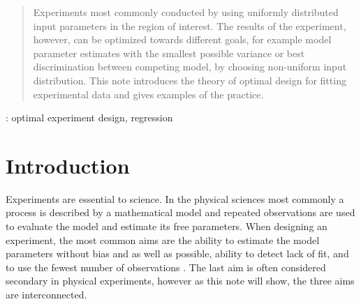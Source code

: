\documentclass[12pt]{iopart}
\begin{document}
\author{G Imreh and W-Y Cheng}
\address{Institute of Atomic and Molecular Sciences, Academia Sinica, Taiwan}
\begin{abstract}
Experiments most commonly conducted by using uniformly distributed input parameters in the region of interest. The results of the experiment, however, can be optimized towards different goals, for example model parameter estimates with the smallest possible variance or best discrimination between competing model, by choosing non-uniform input distribution. This note introduces the theory of optimal design for fitting experimental data and gives examples of the practice.
\end{abstract}

: optimal experiment design, regression




\section{Introduction}


Experiments are essential to science. In the physical sciences most commonly a process is described by a mathematical model and repeated observations are used to evaluate the model and estimate its free parameters. When designing an experiment, the most common aims are the ability to estimate the model parameters without bias and as well as possible, ability to detect lack of fit, and to use the fewest number of observations \cite{Box1975,Box1987}. The last aim is often considered secondary in physical experiments, however as this note will show, the three aims are interconnected.
\end{document}
